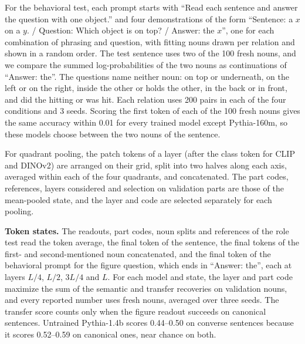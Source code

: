 \documentclass[10pt]{article}
\theoremstyle{plain}
\theoremstyle{remark}
\begin{document}
For the behavioral test, each prompt starts with ``Read each sentence and answer the question with one object.'' and four demonstrations of the form ``Sentence: a $x$ on a $y$. / Question: Which object is on top? / Answer: the $x$'', one for each combination of phrasing and question, with fitting nouns drawn per relation and shown in a random order. The test sentence uses two of the 100 fresh nouns, and we compare the summed log-probabilities of the two nouns as continuations of ``Answer: the''. The questions name neither noun: on top or underneath, on the left or on the right, inside the other or holds the other, in the back or in front, and did the hitting or was hit. Each relation uses 200 pairs in each of the four conditions and 3 seeds. Scoring the first token of each of the 100 fresh nouns gives the same accuracy within 0.01 for every trained model except Pythia-160m, so these models choose between the two nouns of the sentence.

For quadrant pooling, the patch tokens of a layer (after the class token for CLIP and DINOv2) are arranged on their grid, split into two halves along each axis, averaged within each of the four quadrants, and concatenated. The part codes, references, layers considered and selection on validation parts are those of the mean-pooled state, and the layer and code are selected separately for each pooling.

\textbf{Token states.}\label{app:e11} The readouts, part codes, noun splits and references of the role test read the token average, the final token of the sentence, the final tokens of the first- and second-mentioned noun concatenated, and the final token of the behavioral prompt for the figure question, which ends in ``Answer: the'', each at layers $L/4$, $L/2$, $3L/4$ and $L$. For each model and state, the layer and part code maximize the sum of the semantic and transfer recoveries on validation nouns, and every reported number uses fresh nouns, averaged over three seeds. The transfer score counts only when the figure readout succeeds on canonical sentences. Untrained Pythia-1.4b scores 0.44--0.50 on converse sentences because it scores 0.52--0.59 on canonical ones, near chance on both.
\end{document}

